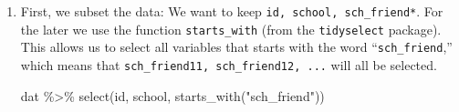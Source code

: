 \documentclass[
]{book}
\newenvironment{Shaded}{\begin{snugshade}}{\end{snugshade}}
\newcommand{\FunctionTok}[1]{\textcolor[rgb]{0.00,0.00,0.00}{#1}}
\newcommand{\NormalTok}[1]{#1}
\newcommand{\SpecialCharTok}[1]{\textcolor[rgb]{0.00,0.00,0.00}{#1}}
\newcommand{\StringTok}[1]{\textcolor[rgb]{0.31,0.60,0.02}{#1}}
\begin{document}
\begin{enumerate}
\def\labelenumi{\arabic{enumi}.}
\item
  First, we subset the data: We want to keep \texttt{id,\ school,\ sch\_friend*}. For the later we use the function \texttt{starts\_with} (from the \texttt{tidyselect} package). This allows us to select all variables that starts with the word ``\texttt{sch\_friend},'' which means that \texttt{sch\_friend11,\ sch\_friend12,\ ...} will all be selected.

\begin{Shaded}
\begin{Highlighting}[]
\NormalTok{dat }\SpecialCharTok{\%\textgreater{}\%} 
  \FunctionTok{select}\NormalTok{(id, school, }\FunctionTok{starts\_with}\NormalTok{(}\StringTok{"sch\_friend"}\NormalTok{))}
\end{Highlighting}
\end{Shaded}


\end{enumerate}
\end{document}
